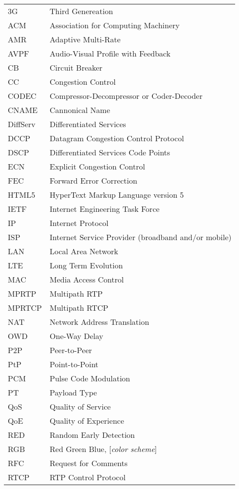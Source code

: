 \begin{longtable}{ll}
3G		& Third Genereation \\
ACM 	& Association for Computing Machinery \\
AMR 	& Adaptive Multi-Rate \\
AVPF	& Audio-Visual Profile with Feedback \\
CB		& Circuit Breaker \\
CC  	& Congestion Control \\
CODEC	& Compressor-Decompressor or Coder-Decoder \\
CNAME	& Cannonical Name \\
DiffServ	& Differentiated Services \\
DCCP 	& Datagram Congestion Control Protocol \\
DSCP 	& Differentiated Services Code Points \\
ECN		& Explicit Congestion Control \\
FEC		& Forward Error Correction \\
HTML5	& HyperText Markup Language version 5\\
IETF	& Internet Engineering Task Force \\
IP		& Internet Protocol \\
ISP 	& Internet Service Provider (broadband and/or mobile)\\
LAN 	& Local Area Network \\
LTE 	& Long Term Evolution \\
MAC 	& Media Access Control \\
MPRTP 	& Multipath RTP \\
MPRTCP	& Multipath RTCP \\
NAT 	& Network Address Translation \\
OWD 	& One-Way Delay \\
P2P 	& Peer-to-Peer \\
PtP 	& Point-to-Point \\
PCM 	& Pulse Code Modulation \\
PT  	& Payload Type \\
QoS 	& Quality of Service \\
QoE 	& Quality of Experience \\
RED 	& Random Early Detection \\
RGB 	& Red Green Blue, [\textit{color scheme}] \\
RFC 	& Request for Comments \\
RTCP 	& RTP Control Protocol \\

\end{longtable}
